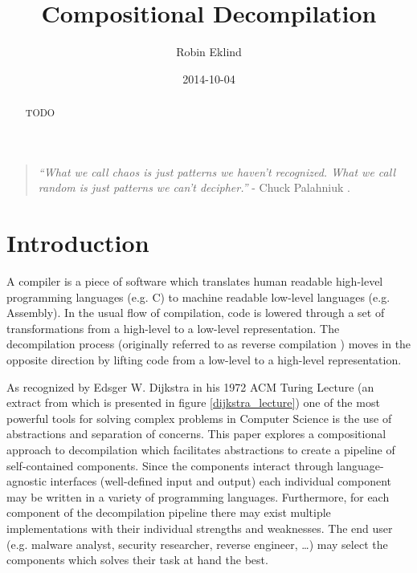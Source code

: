 \documentclass[12pt, a4paper]{article}
\title{Compositional Decompilation}
\author{Robin Eklind}
\date{2014-10-04}
\begin{document}
\maketitle

\begin{abstract}
TODO
\end{abstract}

\vfill

\begin{quote}
	\textit{``What we call chaos is just patterns we haven't recognized. What we call random is just patterns we can't decipher.''} - Chuck Palahniuk \cite{patterns_quote}.
\end{quote}

\pagebreak




\pagebreak

\tableofcontents

\pagebreak



\section{Introduction}

A compiler is a piece of software which translates human readable high-level programming languages (e.g. C) to machine readable low-level languages (e.g. Assembly). In the usual flow of compilation, code is lowered through a set of transformations from a high-level to a low-level representation. The decompilation process (originally referred to as reverse compilation \cite{rev_comp}) moves in the opposite direction by lifting code from a low-level to a high-level representation.

As recognized by Edsger W. Dijkstra in his 1972 ACM Turing Lecture (an extract from which is presented in figure \ref{dijkstra_lecture}) one of the most powerful tools for solving complex problems in Computer Science is the use of abstractions and separation of concerns. This paper explores a compositional approach to decompilation which facilitates abstractions to create a pipeline of self-contained components. Since the components interact through language-agnostic interfaces (well-defined input and output) each individual component may be written in a variety of programming languages. Furthermore, for each component of the decompilation pipeline there may exist multiple implementations with their individual strengths and weaknesses. The end user (e.g. malware analyst, security researcher, reverse engineer, …) may select the components which solves their task at hand the best.
\end{document}
